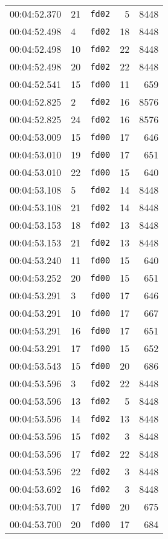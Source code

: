 \documentclass{article}
\begin{document}
\begin{longtable}{lllrr}
00:04:52.370 & 21 & \texttt{fd02} & 5 & 8448 \\
00:04:52.498 & 4 & \texttt{fd02} & 18 & 8448 \\
00:04:52.498 & 10 & \texttt{fd02} & 22 & 8448 \\
00:04:52.498 & 20 & \texttt{fd02} & 22 & 8448 \\
00:04:52.541 & 15 & \texttt{fd00} & 11 & 659 \\
00:04:52.825 & 2 & \texttt{fd02} & 16 & 8576 \\
00:04:52.825 & 24 & \texttt{fd02} & 16 & 8576 \\
00:04:53.009 & 15 & \texttt{fd00} & 17 & 646 \\
00:04:53.010 & 19 & \texttt{fd00} & 17 & 651 \\
00:04:53.010 & 22 & \texttt{fd00} & 15 & 640 \\
00:04:53.108 & 5 & \texttt{fd02} & 14 & 8448 \\
00:04:53.108 & 21 & \texttt{fd02} & 14 & 8448 \\
00:04:53.153 & 18 & \texttt{fd02} & 13 & 8448 \\
00:04:53.153 & 21 & \texttt{fd02} & 13 & 8448 \\
00:04:53.240 & 11 & \texttt{fd00} & 15 & 640 \\
00:04:53.252 & 20 & \texttt{fd00} & 15 & 651 \\
00:04:53.291 & 3 & \texttt{fd00} & 17 & 646 \\
00:04:53.291 & 10 & \texttt{fd00} & 17 & 667 \\
00:04:53.291 & 16 & \texttt{fd00} & 17 & 651 \\
00:04:53.291 & 17 & \texttt{fd00} & 15 & 652 \\
00:04:53.543 & 15 & \texttt{fd00} & 20 & 686 \\
00:04:53.596 & 3 & \texttt{fd02} & 22 & 8448 \\
00:04:53.596 & 13 & \texttt{fd02} & 5 & 8448 \\
00:04:53.596 & 14 & \texttt{fd02} & 13 & 8448 \\
00:04:53.596 & 15 & \texttt{fd02} & 3 & 8448 \\
00:04:53.596 & 17 & \texttt{fd02} & 22 & 8448 \\
00:04:53.596 & 22 & \texttt{fd02} & 3 & 8448 \\
00:04:53.692 & 16 & \texttt{fd02} & 3 & 8448 \\
00:04:53.700 & 17 & \texttt{fd00} & 20 & 675 \\
00:04:53.700 & 20 & \texttt{fd00} & 17 & 684 \\

\end{longtable}
\end{document}
